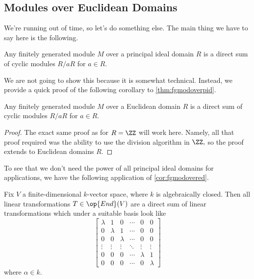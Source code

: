 \subsection{Modules over Euclidean Domains}
We're running out of time, so let's do something else. The main thing we have to say here is the following.
\begin{theorem} \label{thm:fgmodoverpid}
	Any finitely generated module $M$ over a principal ideal domain $R$ is a direct sum of cyclic modules $R/aR$ for $a\in R.$
\end{theorem}
We are not going to show this because it is somewhat technical. Instead, we provide a quick proof of the following corollary to \autoref{thm:fgmodoverpid}.
\begin{corollary} \label{cor:fgmodovered}
	Any finitely generated module $M$ over a Euclidean domain $R$ is a direct sum of cyclic modules $R/aR$ for $a\in R.$
\end{corollary}
\begin{proof}
	The exact same proof as for $R=\ZZ$ will work here. Namely, all that proof required was the ability to use the division algorithm in $\ZZ,$ so the proof extends to Euclidean domains $R.$
\end{proof}
To see that we don't need the power of all principal ideal domains for applications, we have the following application of \autoref{cor:fgmodovered}.
\begin{theorem}
	Fix $V$ a finite-dimensional $k$-vector space, where $k$ is algebraically closed. Then all linear transformations $T\in\op{End}(V)$ are a direct sum of linear transformations which under a suitable basis look like
	\[\begin{bmatrix}
		\lambda & 1 & 0 & \cdots & 0 & 0 \\
		0 & \lambda & 1 & \cdots & 0 & 0 \\
		0 & 0 & \lambda & \cdots & 0 & 0 \\
		\vdots & \vdots & \vdots & \ddots & \vdots & \vdots \\
		0 & 0 & 0 & \cdots & \lambda & 1 \\
		0 & 0 & 0 & \cdots & 0 & \lambda
	\end{bmatrix}\]
	where $\alpha\in k.$
\end{theorem}
